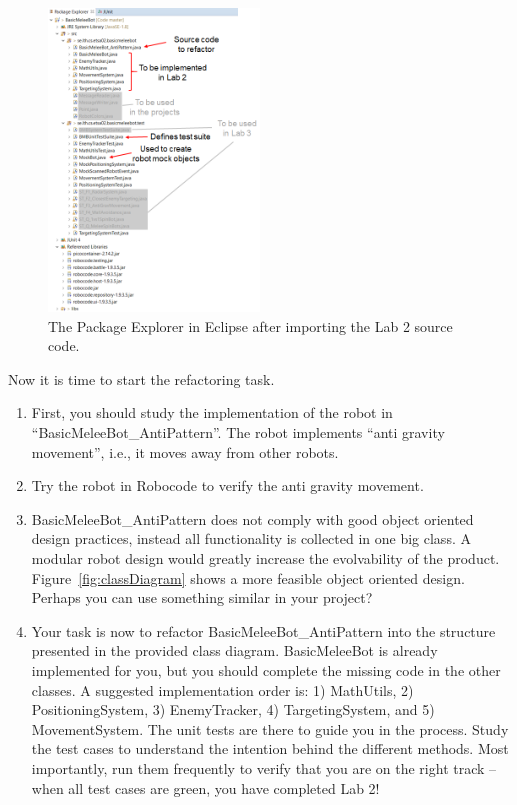 \documentclass{scrreprt}
\begin{document}
\begin{figure}
\centering
\includegraphics[width=0.5\textwidth]{figures/packageExplorerAfterImport.png}
\caption{The Package Explorer in Eclipse after importing the Lab 2 source code.}
\label{fig:afterImport}
\end{figure}

\newpage

Now it is time to start the refactoring task. 
\begin{enumerate}
\item First, you should study the implementation of the robot in ``BasicMeleeBot_AntiPattern''. The robot implements ``anti gravity movement'', i.e., it moves away from other robots. 
\item Try the robot in Robocode to verify the anti gravity movement.
\item BasicMeleeBot_AntiPattern does not comply with good object oriented design practices, instead all functionality is collected in one big class. A modular robot design would greatly increase the evolvability of the product. Figure~\ref{fig:classDiagram} shows a more feasible object oriented design. Perhaps you can use something similar in your project?
\item Your task is now to refactor BasicMeleeBot_AntiPattern into the structure presented in the provided class diagram. BasicMeleeBot is already implemented for you, but you should complete the missing code in the other classes. A suggested implementation order is: 1) MathUtils, 2) PositioningSystem, 3) EnemyTracker, 4) TargetingSystem, and 5) MovementSystem. The unit tests are there to guide you in the process. Study the test cases to understand the intention behind the different methods. Most importantly, run them frequently to verify that you are on the right track -- when all test cases are green, you have completed Lab 2!
\end{enumerate}
\end{document}

